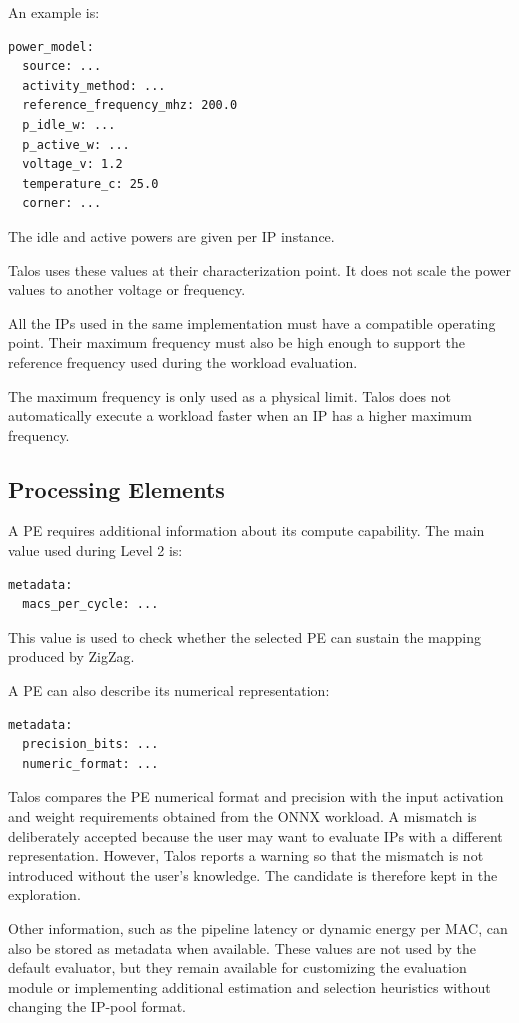 An example is:

\begin{verbatim}
power_model:
  source: ...
  activity_method: ...
  reference_frequency_mhz: 200.0
  p_idle_w: ...
  p_active_w: ...
  voltage_v: 1.2
  temperature_c: 25.0
  corner: ...
\end{verbatim}

The idle and active powers are given per IP instance.

Talos uses these values at their characterization point. It does not
scale the power values to another voltage or frequency.

All the IPs used in the same implementation must have a compatible
operating point. Their maximum frequency must also be high enough to
support the reference frequency used during the workload evaluation.

The maximum frequency is only used as a physical limit. Talos does not
automatically execute a workload faster when an IP has a higher
maximum frequency.


\subsection{Processing Elements}

A PE requires additional information about its compute capability.
The main value used during Level 2 is:

\begin{verbatim}
metadata:
  macs_per_cycle: ...
\end{verbatim}

This value is used to check whether the selected PE can sustain the
mapping produced by ZigZag.

A PE can also describe its numerical representation:

\begin{verbatim}
metadata:
  precision_bits: ...
  numeric_format: ...
\end{verbatim}

Talos compares the PE numerical format and precision with the input
activation and weight requirements obtained from the ONNX workload. A
mismatch is deliberately accepted because the user may want to
evaluate IPs with a different representation. However, Talos reports
a warning so that the mismatch is not introduced without the user's
knowledge. The candidate is therefore kept in the exploration.

Other information, such as the pipeline latency or dynamic energy per
MAC, can also be stored as metadata when available. These values are
not used by the default evaluator, but they remain available for
customizing the evaluation module or implementing additional
estimation and selection heuristics without changing the IP-pool
format.


